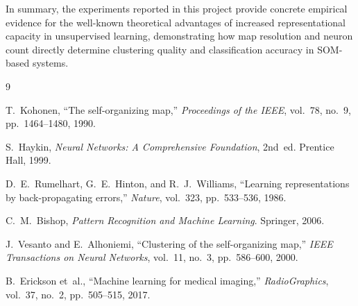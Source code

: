 \documentclass[12pt,a4paper]{report}
\begin{document}
\vspace{1em}
\noindent
In summary, the experiments reported in this project provide concrete empirical evidence
for the well-known theoretical advantages of increased representational capacity in
unsupervised learning, demonstrating how map resolution and neuron count directly
determine clustering quality and classification accuracy in SOM-based systems.

\begin{thebibliography}{9}

T.~Kohonen,
``The self-organizing map,''
\textit{Proceedings of the IEEE}, vol.~78, no.~9, pp.~1464--1480, 1990.

S.~Haykin,
\textit{Neural Networks: A Comprehensive Foundation}, 2nd~ed.
Prentice Hall, 1999.

D.~E.~Rumelhart, G.~E.~Hinton, and R.~J.~Williams,
``Learning representations by back-propagating errors,''
\textit{Nature}, vol.~323, pp.~533--536, 1986.

C.~M.~Bishop,
\textit{Pattern Recognition and Machine Learning}.
Springer, 2006.

J.~Vesanto and E.~Alhoniemi,
``Clustering of the self-organizing map,''
\textit{IEEE Transactions on Neural Networks}, vol.~11, no.~3,
pp.~586--600, 2000.

B.~Erickson et~al.,
``Machine learning for medical imaging,''
\textit{RadioGraphics}, vol.~37, no.~2, pp.~505--515, 2017.

\end{thebibliography}
\end{document}
